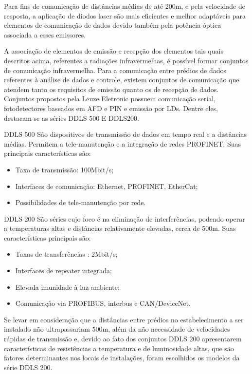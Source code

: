 Para fins de comunicação de distâncias médias de até 200m, e pela velocidade de resposta, a aplicação de diodos laser são mais eficientes e melhor adaptáveis para elementos de comunicação de dados devido também pela potência óptica associada a esses emissores.

A associação de elementos de emissão e recepção dos elementos tais quais descritos acima, referentes a radiações infravermelhas, é possível formar conjuntos de comunicação infravermelha. Para a comunicação entre prédios de dados referentes à análise de dados e controle, existem conjuntos de comunicação que atendem tanto os requisitos de emissão quanto os de recepção de dados. Conjuntos propostos pela Leuze Eletronic possuem comunicação serial, fotodetectores baseados em AFD e PIN e emissão por LDs. Dentre eles, destacam-se as séries  DDLS 500 E DDLS200.

DDLS 500 São dispositivos de transmissão de dados em tempo real e a distâncias médias. Permitem a tele-manutenção e a integração de redes PROFINET. Suas principais características são:
\begin{itemize}
\item Taxa de transmissão: 100Mbit/s;
\item Interfaces de comunicação: Ethernet, PROFINET, EtherCat;
\item Possibilidades de tele-manutenção por rede.
\end{itemize}

DDLS 200 São séries cujo foco é na eliminação de interferências, podendo operar a temperaturas altas e distâncias relativamente elevadas, cerca de 500m. Suas características principais são:
\begin{itemize}
\item Taxas de transferências : 2Mbit/s;
\item Interfaces de repeater integrada;
\item Elevada imunidade à luz ambiente;
\item Comunicação via PROFIBUS, interbus e CAN/DeviceNet.
\end{itemize}

Se levar em consideração que a distâncias entre prédios no estabelecimento a ser instalado não ultrapassariam 500m, além da não necessidade de velocidades rápidas de transmissão e, devido ao fato dos conjuntos DDLS 200 apresentarem características de resistências a temperatura e de luminosidade altas, que são fatores determinantes nos locais de instalações, foram escolhidos os modelos da série DDLS 200.

